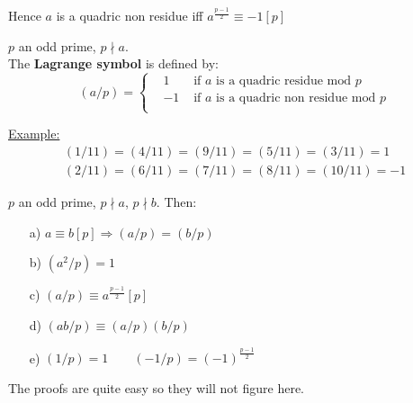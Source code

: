 \documentclass{report}
\begin{document}
														Hence $a$ is a quadric non residue iff $a^\frac{p-1}{2}\equiv -1[p]$
\begin{defi} $p$ an odd prime, $p\nmid a$.\\
						 The \textbf{Lagrange symbol} is defined by:\[(a/p)=\left \{
																																\begin{array}{lcl}
																																&1&\text{ if } a \text{ is a quadric residue mod }p\\
																																&-1&\text{ if } a \text{ is a quadric non residue mod }p\\
																																\end{array}
																																\right.\]
\end{defi}
\underline{Example:} \[\begin{array}{lcl}(1/11)=(4/11)=(9/11)=(5/11)=(3/11)=1\\
																				 (2/11)=(6/11)=(7/11)=(8/11)=(10/11)=-1
											\end{array}\]
														
\begin{thm} $p$ an odd prime, $p\nmid a$, $p\nmid b$. Then:
						\begin{itemize}
						\item[a)] $a\equiv b[p] \Rightarrow (a/p)=(b/p)$
						\item[b)] $(a^2/p)=1$
						\item[c)] $(a/p)\equiv a^\frac{p-1}{2}[p]$
						\item[d)] $(ab/p)\equiv (a/p)(b/p)$
						\item[e)] $(1/p)=1 \qquad (-1/p)=(-1)^\frac{p-1}{2}$
						\end{itemize}
\end{thm}
The proofs are quite easy so they will not figure here.
\end{document}
